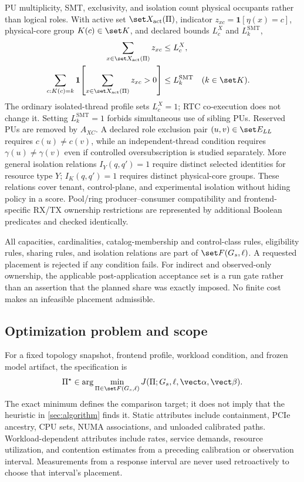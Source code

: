 PU multiplicity, SMT, exclusivity, and isolation count physical occupants rather than logical roles. With active set $\set X_{\mathrm{act}}(\Pi)$, indicator $z_{xc}=\mathbf{1}[\eta(x)=c]$, physical-core group $K(c)\in\set K$, and declared bounds $L_c^X$ and $L_k^{\mathrm{SMT}}$,
\begin{align}
 \sum_{x\in\set X_{\mathrm{act}}(\Pi)}z_{xc}&\leq L_c^X, \label{eq:pu-multiplicity}\\
 \sum_{c:K(c)=k}\mathbf{1}\!\left[\sum_{x\in\set X_{\mathrm{act}}(\Pi)}z_{xc}>0\right]
 &\leq L_k^{\mathrm{SMT}} &&(k\in\set K). \label{eq:smt}
\end{align}
The ordinary isolated-thread profile sets $L_c^X=1$; RTC co-execution does not change it. Setting $L_k^{\mathrm{SMT}}=1$ forbids simultaneous use of sibling PUs. Reserved PUs are removed by $A_{XC}$. A declared role exclusion pair $(u,v)\in\set E_{LL}$ requires $c(u)\neq c(v)$, while an independent-thread condition requires $\gamma(u)\neq\gamma(v)$ even if controlled oversubscription is studied separately. More general isolation relations $I_Y(q,q')=1$ require distinct selected identities for resource type $Y$; $I_K(q,q')=1$ requires distinct physical-core groups. These relations cover tenant, control-plane, and experimental isolation without hiding policy in a score. Pool/ring producer--consumer compatibility and frontend-specific RX/TX ownership restrictions are represented by additional Boolean predicates and checked identically.

All capacities, cardinalities, catalog-membership and control-class rules, eligibility rules, sharing rules, and isolation relations are part of $\set F(G_s,\ell)$. A requested placement is rejected if any condition fails. For indirect and observed-only ownership, the applicable post-application acceptance set is a run gate rather than an assertion that the planned share was exactly imposed. No finite cost makes an infeasible placement admissible.

\subsection{Optimization problem and scope}

For a fixed topology snapshot, frontend profile, workload condition, and frozen model artifact, the specification is
\begin{equation}
 \Pi^\star\in\arg\min_{\Pi\in\set F(G_s,\ell)}
 J(\Pi;G_s,\ell,\vect\alpha,\vect\beta).
 \label{eq:optimization}
\end{equation}
The exact minimum defines the comparison target; it does not imply that the heuristic in \cref{sec:algorithm} finds it. Static attributes include containment, PCIe ancestry, CPU sets, NUMA associations, and unloaded calibrated paths. Workload-dependent attributes include rates, service demands, resource utilization, and contention estimates from a preceding calibration or observation interval. Measurements from a response interval are never used retroactively to choose that interval's placement.


